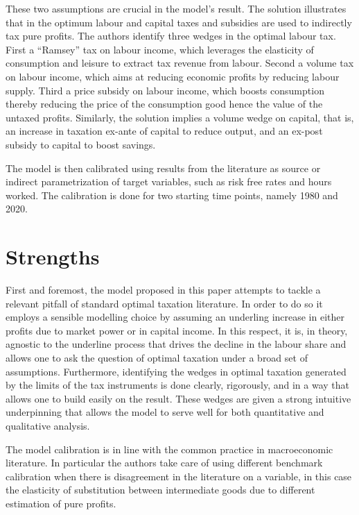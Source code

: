 \documentclass[american]{scrartcl}
\begin{document}
These two assumptions are crucial in the model's result. The solution illustrates that in the optimum labour and capital taxes and subsidies are used to indirectly tax pure profits. The authors identify three wedges in the optimal labour tax. First a ``Ramsey'' tax on labour income, which leverages the elasticity of consumption and leisure to extract tax revenue from labour. Second a volume tax on labour income, which aims at reducing economic profits by reducing labour supply. Third a price subsidy on labour income, which boosts consumption thereby reducing the price of the consumption good hence the value of the untaxed profits. Similarly, the solution implies a volume wedge on capital, that is, an increase in taxation ex-ante of capital to reduce output, and an ex-post subsidy to capital to boost savings.

The model is then calibrated using results from the literature as source or indirect parametrization of target variables, such as risk free rates and hours worked. The calibration is done for two starting time points, namely 1980 and 2020.

\section{Strengths}

First and foremost, the model proposed in this paper attempts to tackle a relevant pitfall of standard optimal taxation literature. In order to do so it employs a sensible modelling choice by assuming an underling increase in either profits due to market power or in capital income. In this respect, it is, in theory, agnostic to the underline process that drives the decline in the labour share and allows one to ask the question of optimal taxation under a broad set of assumptions. Furthermore, identifying the wedges in optimal taxation generated by the limits of the tax instruments is done clearly, rigorously, and in a way that allows one to build easily on the result. These wedges are given a strong intuitive underpinning that allows the model to serve well for both quantitative and qualitative analysis.

The model calibration is in line with the common practice in macroeconomic literature. In particular the authors take care of using different benchmark calibration when there is disagreement in the literature on a variable, in this case the elasticity of substitution between intermediate goods due to different estimation of pure profits.
\end{document}
